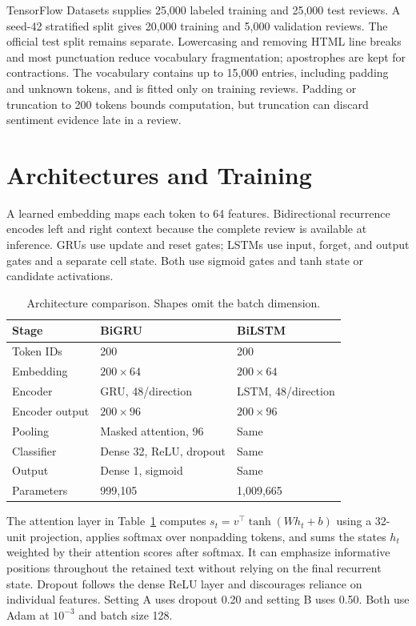 \documentclass[conference]{IEEEtran}
\begin{document}
TensorFlow Datasets supplies 25,000 labeled training and 25,000 test reviews. A seed-42 stratified split gives 20,000 training and 5,000 validation reviews. The official test split remains separate. Lowercasing and removing HTML line breaks and most punctuation reduce vocabulary fragmentation; apostrophes are kept for contractions. The vocabulary contains up to 15,000 entries, including padding and unknown tokens, and is fitted only on training reviews. Padding or truncation to 200 tokens bounds computation, but truncation can discard sentiment evidence late in a review.

\section{Architectures and Training}
A learned embedding maps each token to 64 features. Bidirectional recurrence encodes left and right context because the complete review is available at inference. GRUs use update and reset gates; LSTMs use input, forget, and output gates and a separate cell state. Both use sigmoid gates and tanh state or candidate activations.

\begin{table}[!ht]
\caption{Architecture comparison. Shapes omit the batch dimension.}
\label{tab:architecture}
\centering\footnotesize
\begin{tabular}{@{}lll@{}}
\toprule
Stage & BiGRU & BiLSTM\\
\midrule
Token IDs & 200 & 200\\
Embedding & $200\times64$ & $200\times64$\\
Encoder & GRU, 48/direction & LSTM, 48/direction\\
Encoder output & $200\times96$ & $200\times96$\\
Pooling & Masked attention, 96 & Same\\
Classifier & Dense 32, ReLU, dropout & Same\\
Output & Dense 1, sigmoid & Same\\
Parameters & 999,105 & 1,009,665\\
\bottomrule
\end{tabular}
\end{table}

The attention layer in Table~\ref{tab:architecture} computes $s_t=v^\top\tanh(Wh_t+b)$ using a 32-unit projection, applies softmax over nonpadding tokens, and sums the states $h_t$ weighted by their attention scores after softmax. It can emphasize informative positions throughout the retained text without relying on the final recurrent state. Dropout follows the dense ReLU layer and discourages reliance on individual features. Setting A uses dropout 0.20 and setting B uses 0.50. Both use Adam at $10^{-3}$ and batch size 128.
\end{document}

